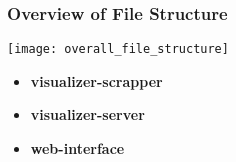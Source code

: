 \subsubsection{Overview of File Structure}
\texttt{[image: overall\_file\_structure]} \\[0.5cm]
\begin{itemize}
	\item \textbf{visualizer-scrapper}
	\item \textbf{visualizer-server}
	\item \textbf{web-interface}
\end{itemize}
